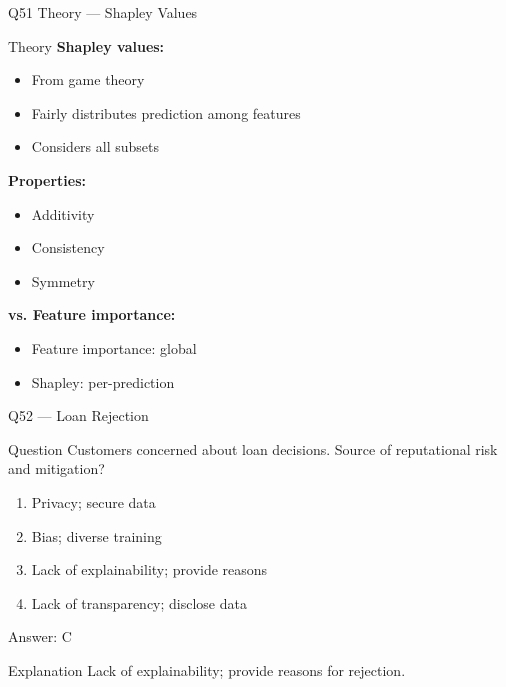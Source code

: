 \documentclass[aspectratio=169,8pt]{beamer}
\begin{document}
	\begin{frame}{Q51 Theory --- Shapley Values}
		\begin{block}{Theory}
			\textbf{Shapley values:}
			\begin{itemize}
				\item From game theory
				\item Fairly distributes prediction among features
				\item Considers all subsets
			\end{itemize}
			\textbf{Properties:}
			\begin{itemize}
				\item Additivity
				\item Consistency
				\item Symmetry
			\end{itemize}
			\textbf{vs. Feature importance:}
			\begin{itemize}
				\item Feature importance: global
				\item Shapley: per-prediction
			\end{itemize}
		\end{block}
	\end{frame}
	
	\begin{frame}{Q52 --- Loan Rejection}
		\begin{block}{Question}
			Customers concerned about loan decisions. Source of reputational risk and mitigation?
		\end{block}
		\begin{enumerate}[label=\Alph*.]
			\item Privacy; secure data
			\item Bias; diverse training
			\item Lack of explainability; provide reasons
			\item Lack of transparency; disclose data
		\end{enumerate}
		\begin{exampleblock}{Answer: C}
		\end{exampleblock}
		\begin{block}{Explanation}
			Lack of explainability; provide reasons for rejection.
		\end{block}
	\end{frame}
	
\end{document}
